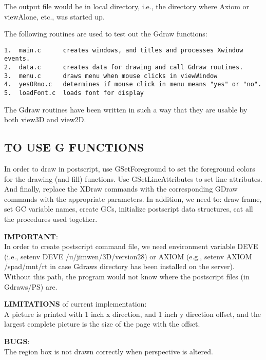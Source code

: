 \documentclass{article}
\begin{document}
The output file would be in local directory, i.e., the directory where Axiom
or viewAlone, etc., was started up.

The following routines are used to test out the Gdraw functions:
\begin{verbatim}
1.  main.c      creates windows, and titles and processes Xwindow events.
2.  data.c      creates data for drawing and call Gdraw routines.
3.  menu.c      draws menu when mouse clicks in viewWindow
4.  yesORno.c   determines if mouse click in menu means "yes" or "no".
5.  loadFont.c 	loads font for display
\end{verbatim}

The Gdraw routines have been written in such a way that they are usable by
both view3D and view2D.

\subsection{TO USE G FUNCTIONS}

In order to draw in postscript, use GSetForeground to set the foreground
colors for the drawing (and fill) functions.  Use GSetLineAttributes
to set line attributes.  And finally, replace the XDraw commands with the
corresponding GDraw commands with the appropriate parameters.  In addition,
we need to: draw frame, set GC variable names, create GCs, initialize
postscript data structures, cat all the procedures used together.

{\bf IMPORTANT}:\\
In order to create postscript command file, we need environment
variable DEVE (i.e., setenv DEVE /u/jimwen/3D/version28) or AXIOM (e.g., setenv
AXIOM /spad/mnt/rt in case Gdraws directory has been installed on the server).
Without this path, the program would not know where the postscript files (in
Gdraws/PS) are.

{\bf LIMITATIONS} of current implementation:\\
A picture is printed with 1 inch x direction, and 1 inch y direction
offset, and the largest complete picture is the size of the page
with the offset.

{\bf BUGS}:\\
The region box is not drawn correctly when perspective is altered.
\end{document}
